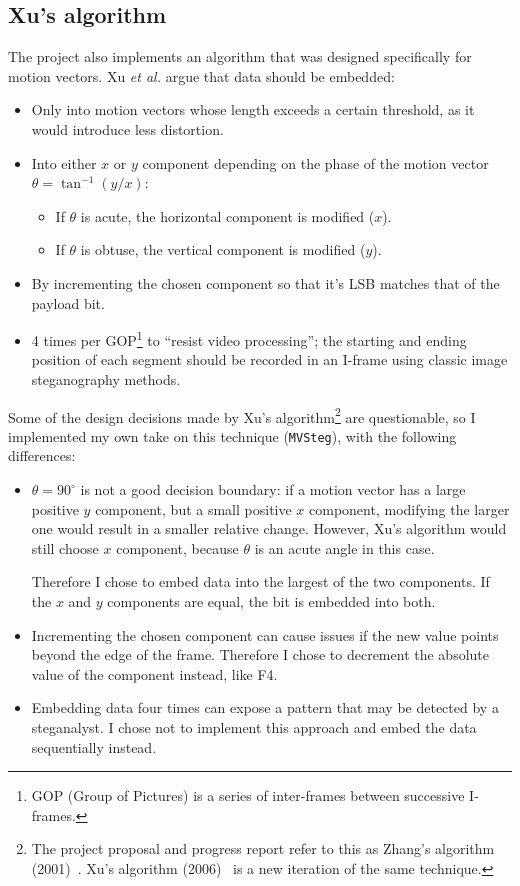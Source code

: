 \documentclass[12pt,british,twoside,notitlepage,usenames,dvipsnames,hypens,final]{report}
\numberwithin{equation}{section}
\numberwithin{figure}{section}
\begin{document}
\subsection{Xu's algorithm}
\label{xu-alg}

The project also implements an algorithm that was designed specifically for motion vectors. Xu \emph{et al.} \cite{xu2006steganography} argue that data should be embedded:
\begin{itemize}
\item Only into motion vectors whose length exceeds a certain threshold, as it would introduce less distortion.
\item Into either $x$ or $y$ component depending on the phase of the motion vector $\theta = \tan^{-1}(y/x)$:
    \begin{itemize}
    \item If $\theta$ is acute, the horizontal component is modified ($x$).
    \item If $\theta$ is obtuse, the vertical component is modified ($y$).
    \end{itemize}
\item By incrementing the chosen component so that it's LSB matches that of the payload bit.
\item 4 times per GOP\footnote{GOP (Group of Pictures) is a series of inter-frames between successive I-frames.} to ``resist video processing''; the starting and ending position of each segment should be recorded in an I-frame using classic image steganography methods.
\end{itemize}

Some of the design decisions made by Xu's algorithm\footnote{The project proposal and progress report refer to this as Zhang's algorithm (2001)~\cite{zhang2001video}. Xu's algorithm (2006)~\cite{xu2006steganography} is a new iteration of the same technique.} are questionable, so I implemented my own take on this technique (\texttt{MVSteg}), with the following differences:
\begin{itemize}
\item $\theta = 90^{\circ}$ is not a good decision boundary: if a motion vector has a large positive $y$ component, but a small positive $x$ component, modifying the larger one would result in a smaller relative change. However, Xu's algorithm would still choose $x$ component, because $\theta$ is an acute angle in this case.

Therefore I chose to embed data into the largest of the two components. If the $x$ and $y$ components are equal, the bit is embedded into both. 

\item Incrementing the chosen component can cause issues if the new value points beyond the edge of the frame. Therefore I chose to decrement the absolute value of the component instead, like F4.

\item Embedding data four times can expose a pattern that may be detected by a steganalyst. I chose not to implement this approach and embed the data sequentially instead.
\end{itemize}
\end{document}
